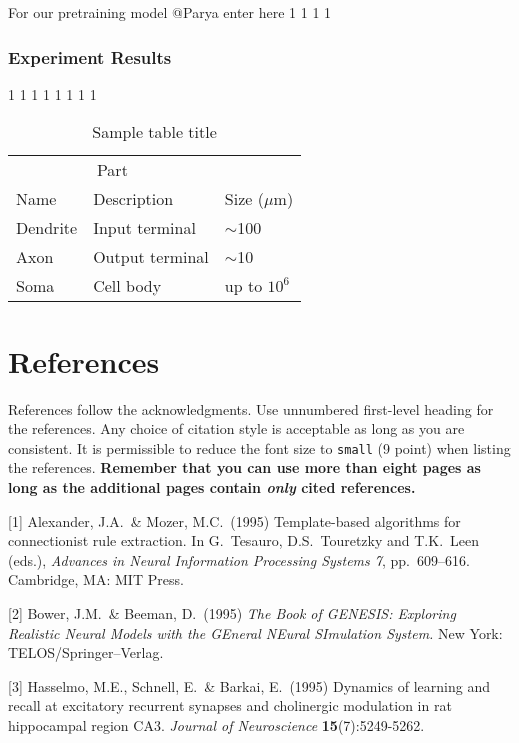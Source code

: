 \documentclass{article}
\begin{document}
For our pretraining model @Parya enter here
1
1
1
1

\subsubsection{Experiment Results}
1
1
1
1
1
1
1
1


\begin{table}
  \caption{Sample table title}
  \label{sample-table}
  \centering
  \begin{tabular}{lll}
    \toprule
    \multicolumn{2}{c}{Part}                   \\
    \cmidrule(r){1-2}
    Name     & Description     & Size ($\mu$m) \\
    \midrule
    Dendrite & Input terminal  & $\sim$100     \\
    Axon     & Output terminal & $\sim$10      \\
    Soma     & Cell body       & up to $10^6$  \\
    \bottomrule
  \end{tabular}
\end{table}

\section*{References}

References follow the acknowledgments. Use unnumbered first-level
heading for the references. Any choice of citation style is acceptable
as long as you are consistent. It is permissible to reduce the font
size to \verb+small+ (9 point) when listing the references. {\bf
  Remember that you can use more than eight pages as long as the
  additional pages contain \emph{only} cited references.}
\medskip

\small

[1] Alexander, J.A.\ \& Mozer, M.C.\ (1995) Template-based algorithms
for connectionist rule extraction. In G.\ Tesauro, D.S.\ Touretzky and
T.K.\ Leen (eds.), {\it Advances in Neural Information Processing
  Systems 7}, pp.\ 609--616. Cambridge, MA: MIT Press.

[2] Bower, J.M.\ \& Beeman, D.\ (1995) {\it The Book of GENESIS:
  Exploring Realistic Neural Models with the GEneral NEural SImulation
  System.}  New York: TELOS/Springer--Verlag.

[3] Hasselmo, M.E., Schnell, E.\ \& Barkai, E.\ (1995) Dynamics of
learning and recall at excitatory recurrent synapses and cholinergic
modulation in rat hippocampal region CA3. {\it Journal of
  Neuroscience} {\bf 15}(7):5249-5262.
\end{document}
